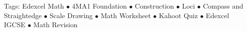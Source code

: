 \documentclass[11pt,a4paper]{article}
\begin{document}
\vspace{14pt}
\begin{center}
  \sffamily\scriptsize\textcolor{textmuted}{
    Tags: Edexcel Math $\bullet$ 4MA1 Foundation $\bullet$ Construction $\bullet$ Loci $\bullet$ Compass and Straightedge $\bullet$ Scale Drawing $\bullet$ Math Worksheet $\bullet$ Kahoot Quiz $\bullet$ Edexcel IGCSE $\bullet$ Math Revision
  }
\end{center}
\end{document}
